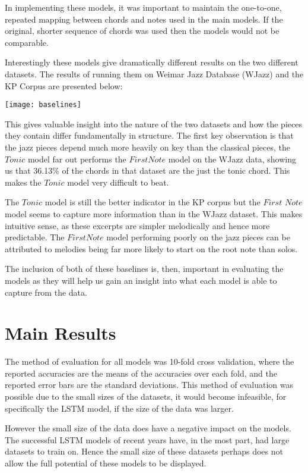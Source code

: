 \documentclass[bsc,singlespacing,logo, parskip, deptreport]{infthesis}
\begin{document}
In implementing these models, it was important to maintain the one-to-one, repeated mapping between chords and notes used in the main models. If the original, shorter sequence of chords was used then the models would not be comparable.

Interestingly these models give dramatically different results on the two different datasets. The results of running them on Weimar Jazz Database (WJazz) and the KP Corpus are presented below:

\begin{center}
\texttt{[image: baselines]}
\end{center}

This gives valuable insight into the nature of the two datasets and how the pieces they contain differ fundamentally in structure. The first key observation is that the jazz pieces depend much more heavily on key than the classical pieces, the $Tonic$ model far out performs the $First Note$ model on the WJazz data, showing us that 36.13\% of the chords in that dataset are the just the tonic chord. This makes the $Tonic$ model very difficult to beat.

The $Tonic$ model is still the better indicator in the KP corpus but the $First$ $Note$ model seems to capture more information than in the WJazz dataset. This makes intuitive sense, as these excerpts are simpler melodically and hence more predictable. The $First Note$ model performing poorly on the jazz pieces can be attributed to melodies being far more likely to start on the root note than solos.

The inclusion of both of these baselines is, then, important in evaluating the models as they will help us gain an insight into what each model is able to capture from the data.

\section{Main Results} \label{Main Results}

The method of evaluation for all models was 10-fold cross validation, where the reported accuracies are the means of the accuracies over each fold, and the reported error bars are the standard deviations. This method of evaluation was possible due to the small sizes of the datasets, it would become infeasible, for specifically the LSTM model, if the size of the data was larger.

However the small size of the data does have a negative impact on the models. The successful LSTM models of recent years have, in the most part, had large datasets to train on. Hence the small size of these datasets perhaps does not allow the full potential of these models to be displayed.
\end{document}
